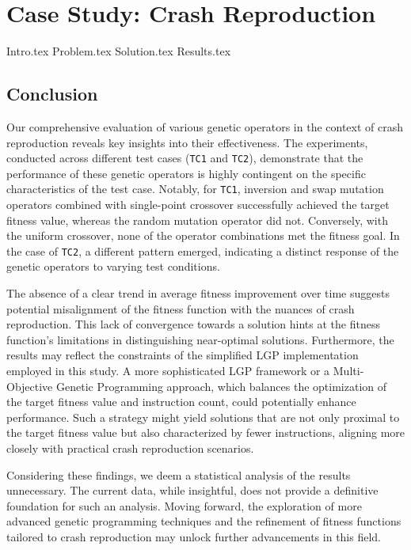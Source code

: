 \chapter{Case Study: Crash Reproduction}
\label{chap:beacon}
    {Intro.tex}
    {Problem.tex}
    {Solution.tex}
    {Results.tex}
    \newpage
    \section{Conclusion}
    \label{sec:bea  con:conclusion}

        Our comprehensive evaluation of various genetic operators in the context of crash reproduction reveals key 
        insights into their effectiveness. The experiments, conducted across different test cases (\texttt{TC1} and 
        \texttt{TC2}), demonstrate that the performance of these genetic operators is highly contingent on the specific 
        characteristics of the test case. Notably, for \texttt{TC1}, inversion and swap mutation operators combined with 
        single-point crossover successfully achieved the target  fitness value, whereas the random mutation operator did 
        not. Conversely, with the uniform crossover, none of the operator combinations met the fitness goal. In the case 
        of \texttt{TC2}, a different pattern emerged, indicating a distinct response of the genetic operators to varying 
        test conditions.

        The absence of a clear trend in average fitness improvement over time suggests potential misalignment of the 
        fitness function with the nuances of crash reproduction. This lack of convergence towards a solution hints at 
        the fitness function's limitations in distinguishing near-optimal solutions. Furthermore, the results may 
        reflect the constraints of the simplified LGP implementation employed in this study. A more sophisticated LGP 
        framework or a Multi-Objective Genetic Programming approach, which balances the optimization of the target 
        fitness value and instruction count, could potentially enhance performance. Such a strategy might yield 
        solutions that are not only proximal to the target fitness value but also characterized by fewer instructions, 
        aligning more closely with practical crash reproduction scenarios.

        Considering these findings, we deem a statistical analysis of the results unnecessary. The current data, while 
        insightful, does not provide a definitive foundation for such an analysis. Moving forward, the exploration of 
        more advanced genetic programming techniques and the refinement of fitness functions tailored to crash 
        reproduction may unlock further advancements in this field.
        